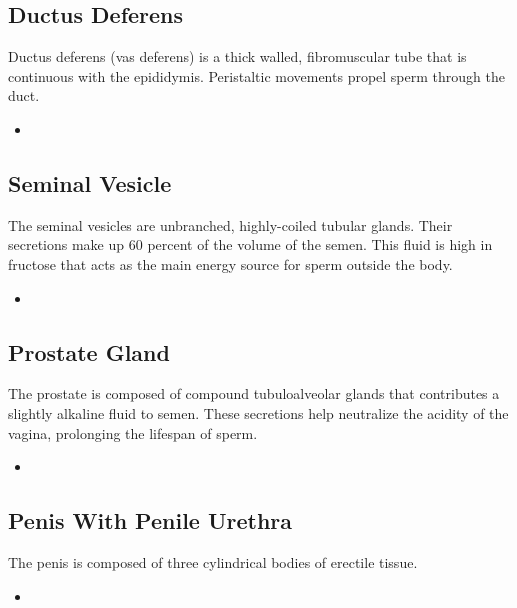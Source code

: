 \subsection{Ductus Deferens}
Ductus deferens (vas deferens) is a thick walled, fibromuscular tube that is continuous with the epididymis. Peristaltic movements propel sperm through the duct.
\begin{center}
\end{center}
\begin{multicols}{2}
\begin{itemize}
  \item 
\end{itemize}
\end{multicols}

\subsection{Seminal Vesicle}
The seminal vesicles are unbranched, highly-coiled tubular glands. Their secretions make up 60 percent of the volume of the semen. This fluid is high in fructose that acts as the main energy source for sperm outside the body.
\begin{center}
\end{center}
\begin{multicols}{2}
\begin{itemize}
  \item 
\end{itemize}
\end{multicols}

\subsection{Prostate Gland}
The prostate is composed of compound tubuloalveolar glands that contributes a slightly alkaline fluid to semen. These secretions help neutralize the acidity of the vagina, prolonging the lifespan of sperm.
\begin{center}
\end{center} 
\begin{multicols}{2}
\begin{itemize}
  \item 
\end{itemize}
\end{multicols}

\subsection{Penis With Penile Urethra}
The penis is composed of three cylindrical bodies of erectile tissue.
\begin{center}
\end{center} 
\begin{multicols}{2}
\begin{itemize}
  \item 
\end{itemize}
\end{multicols}

